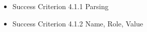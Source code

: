 \documentclass{master_thesis}
\begin{document}
\begin{itemize}
	\item Success Criterion 4.1.1 Parsing

	\item Success Criterion 4.1.2 Name, Role, Value


\end{itemize}
\end{document}
